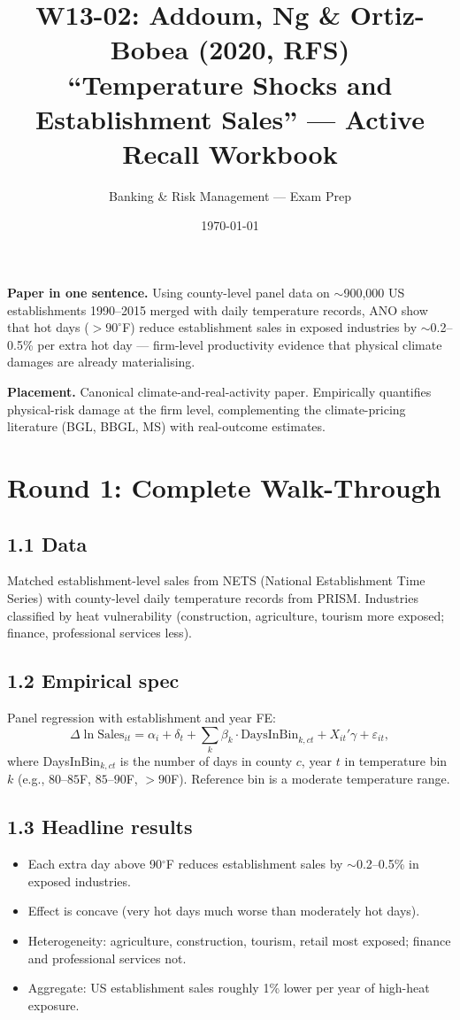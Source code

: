 \documentclass[11pt]{article}
\title{W13-02: Addoum, Ng \& Ortiz-Bobea (2020, RFS) \\
\large ``Temperature Shocks and Establishment Sales'' --- Active Recall Workbook}
\author{Banking \& Risk Management --- Exam Prep}
\date{\today}
\begin{document}
\maketitle

\begin{keybox}
\textbf{Paper in one sentence.} Using county-level panel data on $\sim$900{,}000 US establishments 1990--2015 merged with daily temperature records, ANO show that hot days ($>90^\circ$F) reduce establishment sales in exposed industries by $\sim$0.2--0.5\% per extra hot day --- firm-level productivity evidence that physical climate damages are already materialising.

\textbf{Placement.} Canonical climate-and-real-activity paper. Empirically quantifies physical-risk damage at the firm level, complementing the climate-pricing literature (BGL, BBGL, MS) with real-outcome estimates.
\end{keybox}

\section*{Round 1: Complete Walk-Through}

\subsection*{1.1 Data}
Matched establishment-level sales from NETS (National Establishment Time Series) with county-level daily temperature records from PRISM. Industries classified by heat vulnerability (construction, agriculture, tourism more exposed; finance, professional services less).

\subsection*{1.2 Empirical spec}
Panel regression with establishment and year FE:
\[
\Delta\ln\text{Sales}_{it}=\alpha_i+\delta_t+\sum_k\beta_k\cdot\text{DaysInBin}_{k,ct}+X_{it}'\gamma+\varepsilon_{it},
\]
where DaysInBin$_{k,ct}$ is the number of days in county $c$, year $t$ in temperature bin $k$ (e.g., $80$--$85$F, $85$--$90$F, $>90$F). Reference bin is a moderate temperature range.

\subsection*{1.3 Headline results}
\begin{itemize}
\item Each extra day above 90$^\circ$F reduces establishment sales by $\sim$0.2--0.5\% in exposed industries.
\item Effect is concave (very hot days much worse than moderately hot days).
\item Heterogeneity: agriculture, construction, tourism, retail most exposed; finance and professional services not.
\item Aggregate: US establishment sales roughly 1\% lower per year of high-heat exposure.
\end{itemize}
\end{document}
